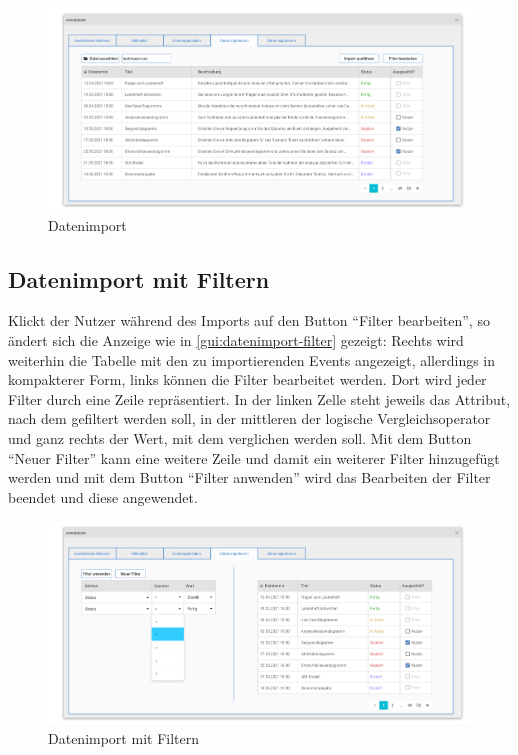 \begin{figure}[ht!]
    \centering
    \includegraphics[width=0.98\columnwidth]{Bilder/mockup_daten_importieren.png}
    \caption{Datenimport}
    \label{gui:datenimport}
\end{figure}

\newpage
\FloatBarrier
\subsection{Datenimport mit Filtern}
Klickt der Nutzer während des Imports auf den Button \enquote{Filter bearbeiten}, so ändert sich die Anzeige wie in \autoref{gui:datenimport-filter} gezeigt: Rechts wird weiterhin die Tabelle mit den zu importierenden Events angezeigt, allerdings in kompakterer Form, links können die Filter bearbeitet werden. Dort wird jeder Filter durch eine Zeile repräsentiert. In der linken Zelle steht jeweils das Attribut, nach dem gefiltert werden soll, in der mittleren der logische Vergleichsoperator und ganz rechts der Wert, mit dem verglichen werden soll. Mit dem Button \enquote{Neuer Filter} kann eine weitere Zeile und damit ein weiterer Filter hinzugefügt werden und mit dem Button \enquote{Filter anwenden} wird das Bearbeiten der Filter beendet und diese angewendet.

\begin{figure}[ht!]
    \centering
    \includegraphics[width=0.98\columnwidth]{Bilder/mockup_daten_importieren_filter.png}
    \caption{Datenimport mit Filtern}
    \label{gui:datenimport-filter}
\end{figure}
